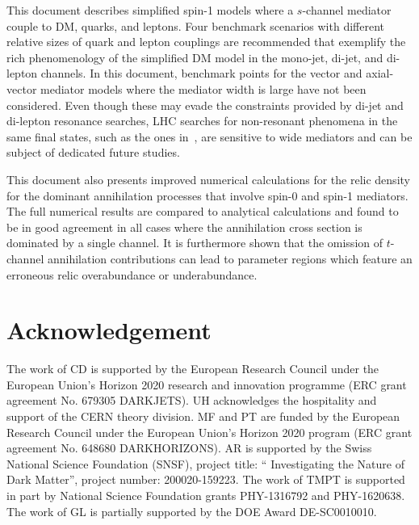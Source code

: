 \documentclass[a4paper, 11pt,notoc]{article}
\begin{document}
This document describes simplified spin-1 models where a $s$-channel mediator couple to DM, quarks, and leptons. Four benchmark scenarios with  different relative sizes of quark and lepton couplings are recommended that exemplify the rich phenomenology of the simplified DM model in the mono-jet, di-jet, and di-lepton channels. In this document, benchmark points for the vector and axial-vector mediator models where the mediator width is large have not been considered. Even though these may evade the constraints provided by di-jet and di-lepton resonance searches, LHC searches for non-resonant phenomena in the same final states, such as the ones in~\cite{ATLAS:2015nsi,CMS-PAS-EXO-15-009,Aad:2014wca, Khachatryan:2015scf}, are sensitive to wide mediators and can be subject of dedicated future studies.

This document also presents improved numerical calculations for the relic density for the dominant annihilation processes  that  involve  spin-0  and  spin-1  mediators. The full numerical results are compared to analytical calculations and found to be in good agreement in all cases  where the annihilation cross section is dominated by a single channel. It is furthermore shown that the omission of $t$-channel annihilation contributions can lead to parameter regions which feature an  erroneous  relic overabundance or  underabundance. 

 

\section{Acknowledgement} 
The work of CD is supported by the European Research Council under the European Union's Horizon 2020 research and innovation programme (ERC grant agreement No. 679305 DARKJETS). UH acknowledges the hospitality and support of the CERN theory division. MF and PT are funded by the European Research Council under the European Union's Horizon 2020 program (ERC grant agreement No. 648680 DARKHORIZONS). AR is supported by the Swiss National Science Foundation (SNSF), project title: `` Investigating the Nature of Dark Matter'', project number: 200020-159223. The work of TMPT is supported in part by National Science Foundation grants PHY-1316792 and PHY-1620638. The work of GL is partially supported by the DOE Award DE-SC0010010.
 



\end{document}
